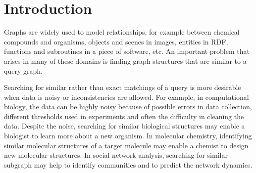 \documentclass{sigmod}
\begin{document}
%
%

%
%

%
%



\section{Introduction}
Graphs  are widely used to model relationships, for example between chemical compounds and organisms, objects and scenes in images, entities in RDF, functions and subroutines in a piece of software, etc. 
An important problem that arises in many of these domains is finding graph structures that are similar to a query graph. 

Searching for similar rather than exact matchings of a query is more desirable when data is noisy or inconsistencies are allowed. 
For example, in computational biology, the data can be highly noisy because of possible errors in data collection, different thresholds used in experiments and  often the difficulty in cleaning the data. Despite the noise, searching for similar biological structures  may enable a biologist to learn more about a new organism\cite{dost2008qnet}. In molecular chemistry,  identifying similar molecular structures of a target molecule may enable a chemist to design new molecular structures\cite{balaban1985applications}. In social network analysis, searching for similar subgraph may help to identify communities and to predict the network dynamics\cite{spertus2005evaluating}. 
\end{document}
